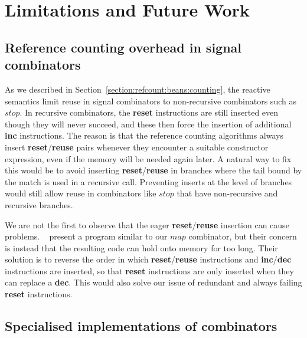 \section{Limitations and Future Work}\label{sec:limitationsAndFutureWork}

\subsection{Reference counting overhead in signal combinators}\label{section:limitationsAndFutureWork:too_many_instructions}

As we described in Section~\ref{section:refcount:beans:counting}, the reactive semantics limit reuse in signal combinators to non-recursive combinators such as $stop$. In recursive combinators, the \textbf{reset} instructions are still inserted even though they will never succeed, and these then force the insertion of additional \textbf{inc} instructions. 
The reason is that the reference counting algorithms always insert \textbf{reset}/\textbf{reuse} pairs whenever they encounter a suitable constructor expression, even if the memory will be needed again later.
A natural way to fix this would be to avoid inserting \textbf{reset}/\textbf{reuse} in branches where the tail bound by the match is used in a recursive call. Preventing inserts at the level of branches would still allow reuse in combinators like $stop$ that have non-recursive and recursive branches. 

We are not the first to observe that the eager \textbf{reset}/\textbf{reuse} insertion can cause problems. 
\citeauthor*{frame_limited_reuse}~\cite{frame_limited_reuse} 
present a program similar to our $map$ combinator, but their concern is instead that the resulting code can hold onto memory for too long.
Their solution is to reverse the order in which \textbf{reset}/\textbf{reuse} instructions and \textbf{inc}/\textbf{dec} instructions are inserted, so that \textbf{reset} instructions are only inserted when they can replace a \textbf{dec}.
This would also solve our issue of redundant and always failing \textbf{reset} instructions. 

\subsection{Specialised implementations of combinators}

